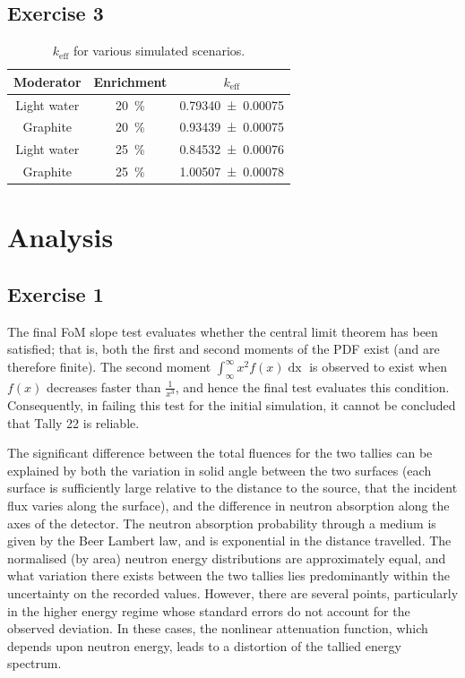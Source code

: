 \documentclass{article}
\begin{document}
  \subsection{Exercise 3}
    \begin{table}[]
    \centering
    \caption{$k_{\text{eff}}$ for various simulated scenarios.}
    \label{table:reactivities}
    \begin{tabular}{@{}ccc@{}}
    \toprule
    Moderator & Enrichment & $k_{\text{eff}}$
    \\
    \midrule
    Light water        & \SI{20}{\percent} &  \num{0.79340 \pm 0.00075} \\
    Graphite           & \SI{20}{\percent} &  \num{0.93439 \pm 0.00075} \\
    Light water        & \SI{25}{\percent} &  \num{0.84532 \pm 0.00076} \\
    Graphite           & \SI{25}{\percent} &  \num{1.00507 \pm 0.00078} \\
    \bottomrule
    \end{tabular}
    \end{table}


\section{Analysis}
  \subsection{Exercise 1}
    The final FoM slope test evaluates whether the central limit theorem has been satisfied; that is, both the first and second moments of the PDF exist (and are therefore finite). The second moment $\int_{\infty}^{\infty}{x^2f(x)\operatorname{dx}}$ is observed to exist when $f(x)$ decreases faster than $\frac{1}{x^3}$, and hence the final test evaluates this condition. Consequently, in failing this test for the initial simulation, it cannot be concluded that Tally 22 is reliable.

    The significant difference between the total fluences for the two tallies can be explained by both the variation in solid angle between the two surfaces (each surface is sufficiently large relative to the distance to the source, that the incident flux varies along the surface), and the difference in neutron absorption along the axes of the detector. The neutron absorption probability through a medium is given by the Beer Lambert law, and is exponential in the distance travelled.
    The normalised (by area) neutron energy distributions are approximately equal, and what variation there exists between the two tallies lies predominantly within the uncertainty on the recorded values. However, there are several points, particularly in the higher energy regime whose standard errors do not account for the observed deviation. In these cases, the nonlinear attenuation function, which depends upon neutron energy, leads to a distortion of the tallied energy spectrum.
\end{document}
